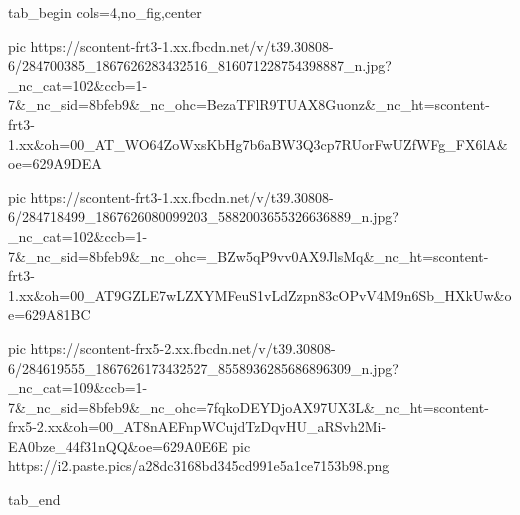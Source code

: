 
 
 
 
 


\ifcmt
  tab_begin cols=4,no_fig,center

     pic https://scontent-frt3-1.xx.fbcdn.net/v/t39.30808-6/284700385_1867626283432516_816071228754398887_n.jpg?_nc_cat=102&ccb=1-7&_nc_sid=8bfeb9&_nc_ohc=BezaTFlR9TUAX8Guonz&_nc_ht=scontent-frt3-1.xx&oh=00_AT_WO64ZoWxsKbHg7b6aBW3Q3cp7RUorFwUZfWFg_FX6lA&oe=629A9DEA

     pic https://scontent-frt3-1.xx.fbcdn.net/v/t39.30808-6/284718499_1867626080099203_5882003655326636889_n.jpg?_nc_cat=102&ccb=1-7&_nc_sid=8bfeb9&_nc_ohc=_BZw5qP9vv0AX9JlsMq&_nc_ht=scontent-frt3-1.xx&oh=00_AT9GZLE7wLZXYMFeuS1vLdZzpn83cOPvV4M9n6Sb_HXkUw&oe=629A81BC

     pic https://scontent-frx5-2.xx.fbcdn.net/v/t39.30808-6/284619555_1867626173432527_8558936285686896309_n.jpg?_nc_cat=109&ccb=1-7&_nc_sid=8bfeb9&_nc_ohc=7fqkoDEYDjoAX97UX3L&_nc_ht=scontent-frx5-2.xx&oh=00_AT8nAEFnpWCujdTzDqvHU_aRSvh2Mi-EA0bze_44f31nQQ&oe=629A0E6E
     pic https://i2.paste.pics/a28dc3168bd345cd991e5a1ce7153b98.png

  tab_end
\fi
